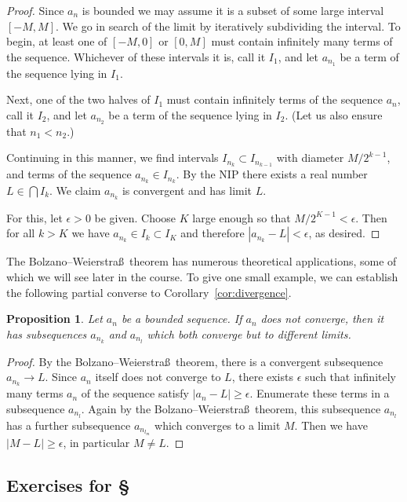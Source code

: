 \documentclass[11pt,oneside]{amsbook}
\theoremstyle{definition}
\theoremstyle{plain}
\newtheorem{prop}[thm]{Proposition}
\theoremstyle{definition}
\theoremstyle{remark}
\numberwithin{equation}{section}
\numberwithin{figure}{section}
\begin{document}
\begin{proof}
  Since $a_n$ is bounded we may assume it is a subset of some large interval $[-M,M]$. We go in search of the limit by iteratively subdividing the interval. To begin, at least one of $[-M,0]$ or $[0,M]$ must contain infinitely many terms of the sequence. Whichever of these intervals it is, call it $I_1$, and let $a_{n_1}$ be a term of the sequence lying in $I_1$.

  Next, one of the two halves of $I_1$ must contain infinitely terms of the sequence $a_n$, call it $I_2$, and let $a_{n_2}$ be a term of the sequence lying in $I_2$. (Let us also ensure that $n_1<n_2$.)

  Continuing in this manner, we find intervals $I_{n_k}\subset I_{n_{k-1}}$ with diameter $M/2^{k-1}$, and terms of the sequence $a_{n_k}\in I_{n_k}$. By the NIP there exists a real number $L\in\bigcap I_k$. We claim $a_{n_k}$ is convergent and has limit $L$.

  For this, let $\epsilon>0$ be given. Choose $K$ large enough so that $M/2^{K-1}<\epsilon$. Then for all $k>K$ we have $a_{n_k}\in I_k\subset I_K$ and therefore $|a_{n_k}-L|<\epsilon$, as desired.
\end{proof}

The Bolzano--Weierstra\ss\ theorem has numerous theoretical applications, some of which we will see later in the course. To give one small example, we can establish the following partial converse to Corollary~\ref{cor:divergence}.

\begin{prop}
  Let $a_n$ be a bounded sequence. If $a_n$ does not converge, then it has subsequences $a_{n_k}$ and $a_{n_l}$ which both converge but to different limits.
\end{prop}

\begin{proof}
  By the Bolzano--Weierstra\ss\ theorem, there is a convergent subsequence $a_{n_k}\to L$. Since $a_n$ itself does not converge to $L$, there exists $\epsilon$ such that infinitely many terms $a_n$ of the sequence satisfy $|a_n-L|\geq\epsilon$. Enumerate these terms in a subsequence $a_{n_l}$. Again by the Bolzano--Weierstra\ss\ theorem, this subsequence $a_{n_l}$ has a further subsequence $a_{n_{l_m}}$ which converges to a limit $M$. Then we have $|M-L|\geq\epsilon$, in particular $M\neq L$.
\end{proof}

\newpage
\subsection*{Exercises for \S \thesection}
\end{document}

